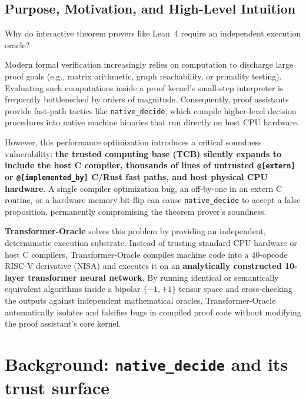 \documentclass[11pt]{article}
\theoremstyle{definition}
\theoremstyle{plain}
\theoremstyle{remark}
\newcommand{\bp}{\{-1,+1\}}
\begin{document}
\subsection{Purpose, Motivation, and High-Level Intuition}
Why do interactive theorem provers like Lean~4 require an independent execution oracle? 

Modern formal verification increasingly relies on computation to discharge large proof goals (e.g., matrix arithmetic, graph reachability, or primality testing). Evaluating such computations inside a proof kernel's small-step interpreter is frequently bottlenecked by orders of magnitude. Consequently, proof assistants provide fast-path tactics like \texttt{native\_decide}, which compile higher-level decision procedures into native machine binaries that run directly on host CPU hardware.

However, this performance optimization introduces a critical soundness vulnerability: \textbf{the trusted computing base (TCB) silently expands to include the host C compiler, thousands of lines of untrusted \texttt{@[extern]} or \texttt{@[implemented\_by]} C/Rust fast paths, and host physical CPU hardware}. A single compiler optimization bug, an off-by-one in an extern C routine, or a hardware memory bit-flip can cause \texttt{native\_decide} to accept a false proposition, permanently compromising the theorem prover's soundness.

\textbf{Transformer-Oracle} solves this problem by providing an independent, deterministic execution substrate. Instead of trusting standard CPU hardware or host C compilers, Transformer-Oracle compiles machine code into a 40-opcode RISC-V derivative (NISA) and executes it on an \textbf{analytically constructed 10-layer transformer neural network}. By running identical or semantically equivalent algorithms inside a bipolar $\bp$ tensor space and cross-checking the outputs against independent mathematical oracles, Transformer-Oracle automatically isolates and falsifies bugs in compiled proof code without modifying the proof assistant's core kernel.


\section{Background: \texttt{native\_decide} and its trust surface}\label{sec:background}
\end{document}
